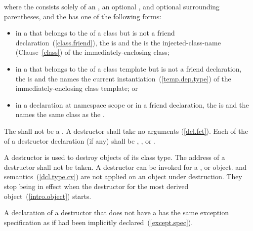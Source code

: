 where the  consists solely of an
, an optional ,
and optional surrounding parentheses, and the  has
one of the following forms:

\begin{itemize}
\item
in a  that belongs to the
 of a class but is not a friend
declaration~(\ref{class.friend}), the  is
\tcode{\~} and the  is the
injected-class-name (Clause~\ref{class}) of the immediately-enclosing class;

\item
in a  that belongs to the
 of a class template but is not a friend
declaration, the  is
\tcode{\~} and the  names the
current instantiation~(\ref{temp.dep.type}) of the immediately-enclosing class template; or

\item
in a declaration at namespace scope or in a friend declaration, the
 is 
\tcode{\~} and the  names the
same class as the .
\end{itemize}

The  shall not be a . A
destructor shall take no arguments (\ref{dcl.fct}).
Each  of the 
of a destructor declaration (if any) shall be , , or
.

\pnum
A destructor is used to destroy objects of its class type.
%
The address of a destructor shall not be taken.
%
%
A destructor can be invoked for a
,
or
object.
and
semantics~(\ref{dcl.type.cv}) are not applied on an object under destruction.
They stop being in effect when the destructor for the
most derived object~(\ref{intro.object}) starts.

\pnum
\begin{note}
A declaration of a destructor that does not have a 
has the same exception specification as if had been implicitly declared~(\ref{except.spec}).
\end{note}

